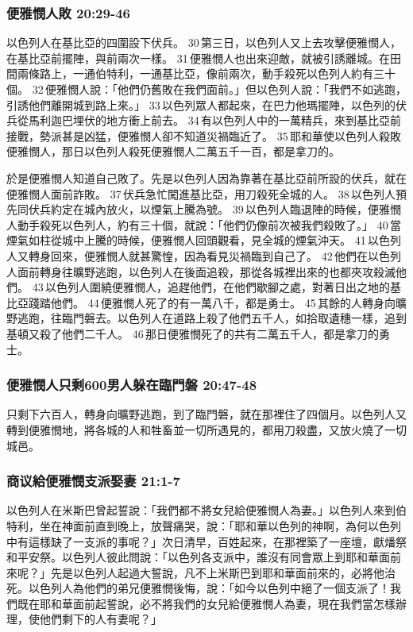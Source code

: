 \subsubsection{便雅憫人敗 20:29-46}
以色列人在基比亞的四圍設下伏兵。 30 第三日，以色列人又上去攻擊便雅憫人，在基比亞前擺陣，與前兩次一樣。 31 便雅憫人也出來迎敵，就被引誘離城。在田間兩條路上，一通伯特利，一通基比亞，像前兩次，動手殺死以色列人約有三十個。 32 便雅憫人說：「他們仍舊敗在我們面前。」但以色列人說：「我們不如逃跑，引誘他們離開城到路上來。」 33 以色列眾人都起來，在巴力他瑪擺陣，以色列的伏兵從馬利迦巴埋伏的地方衝上前去。 34 有以色列人中的一萬精兵，來到基比亞前接戰，勢派甚是凶猛，便雅憫人卻不知道災禍臨近了。 35 耶和華使以色列人殺敗便雅憫人，那日以色列人殺死便雅憫人二萬五千一百，都是拿刀的。

於是便雅憫人知道自己敗了。先是以色列人因為靠著在基比亞前所設的伏兵，就在便雅憫人面前詐敗。 37 伏兵急忙闖進基比亞，用刀殺死全城的人。 38 以色列人預先同伏兵約定在城內放火，以煙氣上騰為號。 39 以色列人臨退陣的時候，便雅憫人動手殺死以色列人，約有三十個，就說：「他們仍像前次被我們殺敗了。」 40 當煙氣如柱從城中上騰的時候，便雅憫人回頭觀看，見全城的煙氣沖天。 41 以色列人又轉身回來，便雅憫人就甚驚惶，因為看見災禍臨到自己了。 42 他們在以色列人面前轉身往曠野逃跑，以色列人在後面追殺，那從各城裡出來的也都夾攻殺滅他們。 43 以色列人圍繞便雅憫人，追趕他們，在他們歇腳之處，對著日出之地的基比亞踐踏他們。 44 便雅憫人死了的有一萬八千，都是勇士。 45 其餘的人轉身向曠野逃跑，往臨門磐去。以色列人在道路上殺了他們五千人，如拾取遺穗一樣，追到基頓又殺了他們二千人。 46 那日便雅憫死了的共有二萬五千人，都是拿刀的勇士。 

\subsubsection{便雅憫人只剩600男人躲在臨門磐 20:47-48}
只剩下六百人，轉身向曠野逃跑，到了臨門磐，就在那裡住了四個月。以色列人又轉到便雅憫地，將各城的人和牲畜並一切所遇見的，都用刀殺盡，又放火燒了一切城邑。

\subsubsection{商议給便雅憫支派娶妻 21:1-7}
以色列人在米斯巴曾起誓說：「我們都不將女兒給便雅憫人為妻。」以色列人來到伯特利，坐在神面前直到晚上，放聲痛哭，說：「耶和華以色列的神啊，為何以色列中有這樣缺了一支派的事呢？」次日清早，百姓起來，在那裡築了一座壇，獻燔祭和平安祭。以色列人彼此問說：「以色列各支派中，誰沒有同會眾上到耶和華面前來呢？」先是以色列人起過大誓說，凡不上米斯巴到耶和華面前來的，必將他治死。以色列人為他們的弟兄便雅憫後悔，說：「如今以色列中絕了一個支派了！我們既在耶和華面前起誓說，必不將我們的女兒給便雅憫人為妻，現在我們當怎樣辦理，使他們剩下的人有妻呢？」
 
